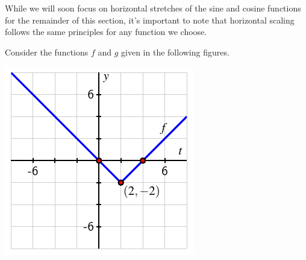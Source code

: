 \documentclass{ximera}
\begin{document}
While we will soon focus on horizontal stretches of the sine and cosine functions for the remainder of this section, it's important to note that horizontal scaling follows the same principles for any function we choose.%
\begin{exploration}
Consider the functions \(f\) and \(g\) given in the following figures.
\begin{image}
\includegraphics[width=1\linewidth]{images/sinusoidal-horiz-scaling-1}


\end{image}
\end{exploration}
\end{document}
